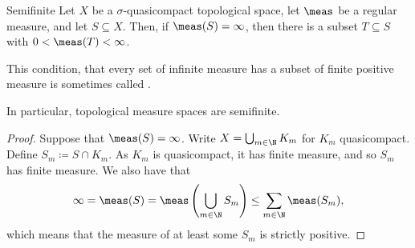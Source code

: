 \begin{prp}{}{Semifinite}
Let $X$ be a $\sigma$-quasicompact topological space, let $\meas$ be a regular measure, and let $S\subseteq X$.  Then, if $\meas (S)=\infty$, then there is a subset $T\subseteq S$ with $0<\meas (T)<\infty$.
\begin{rmk}
This condition, that every set of infinite measure has a subset of finite positive measure is sometimes called .
\end{rmk}
\begin{rmk}
In particular, topological measure spaces are semifinite.
\end{rmk}
\begin{proof}
Suppose that $\meas (S)=\infty$.  Write $X=\bigcup _{m\in \N}K_m$ for $K_m$ quasicompact.  Define $S_m\coloneqq S\cap K_m$.  As $K_m$ is quasicompact, it has finite measure, and so $S_m$ has finite measure.  We also have that
\begin{equation}
\infty =\meas (S)=\meas \left( \bigcup _{m\in \N}S_m\right) \leq \sum _{m\in \N}\meas (S_m),
\end{equation}
which means that the measure of at least some $S_m$ is strictly positive.
\end{proof}
\end{prp}

